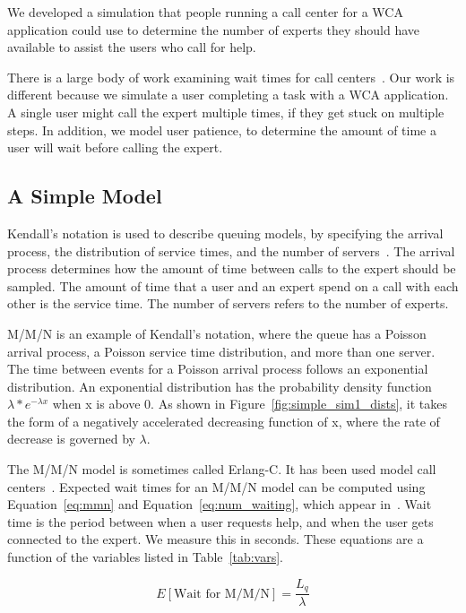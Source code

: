 We developed a simulation that people running a call center for a WCA
application could use to determine the number of experts they should have
available to assist the users who call for help.

There is a large body of work examining wait times for call
centers~\cite{queue1, queue2}.
Our work is different because we simulate a user completing a task with a WCA
application.
A single user might call the expert multiple times, if they get stuck on
multiple steps.
In addition, we model user patience, to determine the amount of time a user will
wait before calling the expert.

\subsection{A Simple Model}\label{sec:simple}

Kendall's notation is used to describe queuing models, by specifying the arrival
process, the distribution of service times, and the number of
servers~\cite{kendall}.
The arrival process determines how the amount of time between calls to the
expert should be sampled.
The amount of time that a user and an expert spend on a call with each other is
the service time.
The number of servers refers to the number of experts.

M/M/N is an example of Kendall's notation, where the queue has a Poisson arrival
process, a Poisson service time distribution, and more than one server.
The time between events for a Poisson arrival process follows an exponential
distribution.
An exponential distribution has the probability density function
$\lambda * e ^ {- \lambda x}$ when x is above 0.
As shown in Figure~\ref{fig:simple_sim1_dists}, it takes the form of a
negatively accelerated decreasing function of x, where the rate of decrease is
governed by $\lambda$.

The M/M/N model is sometimes called Erlang-C.
It has been used model call centers~\cite{queue1}.
Expected wait times for an M/M/N model can be computed using
Equation~\ref{eq:mmn} and Equation~\ref{eq:num_waiting}, which appear
in~\cite{mmn_formula}.
Wait time is the period between when a user requests help, and when the user
gets connected to the expert.
We measure this in seconds.
These equations are a function of the variables listed in Table~\ref{tab:vars}.

\begin{equation}
  E[\text{Wait for M/M/N}] = \frac{L_q}{\lambda}
  \label{eq:mmn}
\end{equation}

